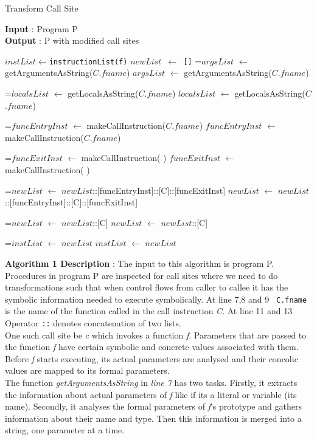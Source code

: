 \documentclass[12pt,oneside]{book}
\newcommand*{\thealgruleheight}{.75\baselineskip}
\newcommand*{\thealgruledepth}{.25\baselineskip}
\newcommand{\myState}[1]{%
    \setbox\statebox=\vbox{#1}%
    \edef\thealgruleheight{\dimexpr \the\ht\statebox+1pt\relax}%
    \edef\thealgruledepth{\dimexpr \the\dp\statebox+1pt\relax}%
    \ifdim\thealgruleheight<.75\baselineskip
        \def\thealgruleheight{\dimexpr .75\baselineskip+1pt\relax}%
    \fi
    \ifdim\thealgruledepth<.25\baselineskip
        \def\thealgruledepth{\dimexpr .25\baselineskip+1pt\relax}%
    \fi
    \State #1%
    \def\thealgruleheight{\dimexpr .75\baselineskip+1pt\relax}%
    \def\thealgruledepth{\dimexpr .25\baselineskip+1pt\relax}%
}
\begin{document}
\begin{algorithm}[H]
  \caption{Transform Call Site}\label{transform call site}
  \small
  \vspace{4mm}
  {\textbf{Input} : Program P}\\
  {\textbf{Output} : P with modified call sites}
  \begin{algorithmic}[1]
      \vspace{0.8mm}
        \vspace{0.8mm}
        \State \texttt{$instList \gets $instructionList(f)}
        \State \texttt{$newList$ $\leftarrow$ []}
        \vspace{0.8mm}
          \vspace{0.8mm}
            \myState {$argsList$ $\gets$ getArgumentsAsString($C$.$fname$)}
            \myState {$localsList$ $\gets$ getLocalsAsString($C$.$fname$)}
			\myState {$funcEntryInst$ $\gets$ makeCallInstruction($C$.$fname$)}
			\myState {$funcExitInst$ $\gets$ makeCallInstruction( )}
			\myState {$newList$ $\gets$ $newList$::[funcEntryInst]::[C]::[funcExitInst]}
          \Else
            \myState {$newList$ $\gets$ $newList$::[C]}
          \EndIf
        \myState {$instList$ $\gets$ $newList$}  
        \EndFor
      \EndFor
    \EndProcedure
  \end{algorithmic}
\end{algorithm}

\textbf{Algorithm 1 Description} : The input to this algorithm is program P. Procedures in program P are inspected for call sites where we need to do transformations such that when control flows from caller to callee it has the symbolic information needed to execute symbolically. At line 7,8 and 9 \texttt{ C.fname} is the name of the function called in the call instruction \textit{C}. At line 11 and 13 Operator \texttt{::} denotes concatenation of two lists.\\
One such call site be \textit{c} which invokes a function \textit{f}. Parameters that are passed to the function \textit{f} have certain symbolic and concrete values associated with them. Before \textit{f} starts executing, its actual parameters are analysed and their concolic values are mapped to its formal parameters.\\ 
The function \textit{getArgumentsAsString} in \textit{line 7} has two tasks. Firstly, it extracts the information about actual parameters of \textit{f} like if its a literal or variable (its name). Secondly, it analyses the formal parameters of \textit{f}'s prototype and gathers information about their name and type. Then this information is merged into a string, one parameter at a time.\\
\end{document}
